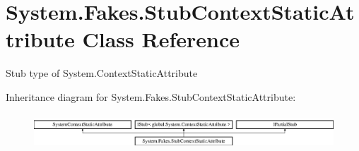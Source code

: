 \hypertarget{class_system_1_1_fakes_1_1_stub_context_static_attribute}{\section{System.\-Fakes.\-Stub\-Context\-Static\-Attribute Class Reference}
\label{class_system_1_1_fakes_1_1_stub_context_static_attribute}
}


Stub type of System.\-Context\-Static\-Attribute 


Inheritance diagram for System.\-Fakes.\-Stub\-Context\-Static\-Attribute\-:\begin{figure}[H]
\begin{center}
\leavevmode
\includegraphics[height=1.362530cm]{class_system_1_1_fakes_1_1_stub_context_static_attribute}
\end{center}
\end{figure}
